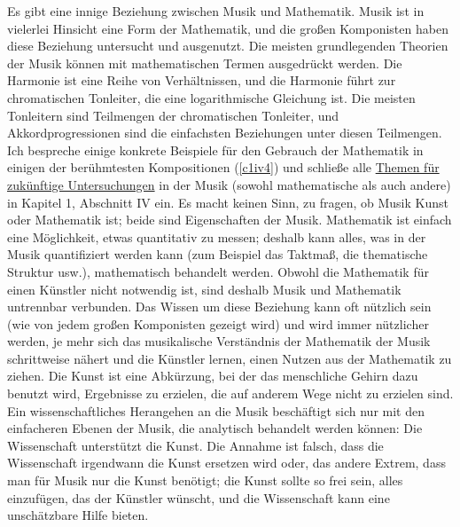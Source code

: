 Es gibt eine innige Beziehung zwischen Musik und Mathematik.
Musik ist in vielerlei Hinsicht eine Form der Mathematik, und die großen Komponisten haben diese Beziehung untersucht und ausgenutzt.
Die meisten grundlegenden Theorien der Musik können mit mathematischen Termen ausgedrückt werden.
Die Harmonie ist eine Reihe von Verhältnissen, und die Harmonie führt zur chromatischen Tonleiter, die eine logarithmische Gleichung ist.
Die meisten Tonleitern sind Teilmengen der chromatischen Tonleiter, und Akkordprogressionen sind die einfachsten Beziehungen unter diesen Teilmengen.
Ich bespreche einige konkrete Beispiele für den Gebrauch der Mathematik in einigen der berühmtesten Kompositionen (\hyperref[c1iv4]{\autoref{c1iv4}}) und schließe alle \hyperref[c1iv6]{Themen für zukünftige Untersuchungen} in der Musik (sowohl mathematische als auch andere) in Kapitel 1, Abschnitt IV ein.
Es macht keinen Sinn, zu fragen, ob Musik Kunst oder Mathematik ist; beide sind Eigenschaften der Musik.
Mathematik ist einfach eine Möglichkeit, etwas quantitativ zu messen; deshalb kann alles, was in der Musik quantifiziert werden kann (zum Beispiel das Taktmaß, die thematische Struktur usw.), mathematisch behandelt werden.
Obwohl die Mathematik für einen Künstler nicht notwendig ist, sind deshalb Musik und Mathematik untrennbar verbunden.
Das Wissen um diese Beziehung kann oft nützlich sein (wie von jedem großen Komponisten gezeigt wird) und wird immer nützlicher werden, je mehr sich das musikalische Verständnis der Mathematik der Musik schrittweise nähert und die Künstler lernen, einen Nutzen aus der Mathematik zu ziehen.
Die Kunst ist eine Abkürzung, bei der das menschliche Gehirn dazu benutzt wird, Ergebnisse zu erzielen, die auf anderem Wege nicht zu erzielen sind.
Ein wissenschaftliches Herangehen an die Musik beschäftigt sich nur mit den einfacheren Ebenen der Musik, die analytisch behandelt werden können: Die Wissenschaft unterstützt die Kunst.
Die Annahme ist falsch, dass die Wissenschaft irgendwann die Kunst ersetzen wird oder, das andere Extrem, dass man für Musik nur die Kunst benötigt; die Kunst sollte so frei sein, alles einzufügen, das der Künstler wünscht, und die Wissenschaft kann eine unschätzbare Hilfe bieten.

